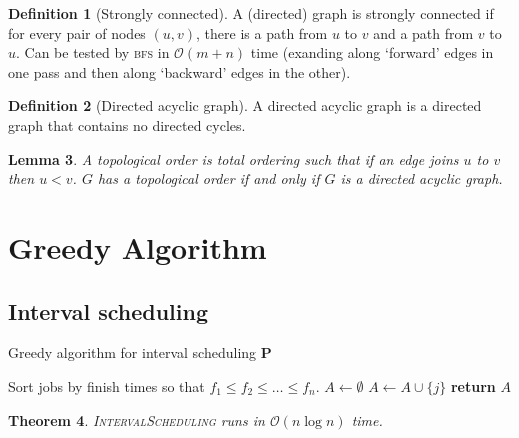 \documentclass[10pt, oneside, reqno]{amsart}
\theoremstyle{plain}%
\newtheorem{thm}{Theorem}[section]
\newtheorem{lem}[thm]{Lemma}
\theoremstyle{definition}
\newtheorem{defn}[thm]{Definition}
\theoremstyle{remark}
\newcommand{\bigo}[1]{\mathcal{O}(#1)}
\begin{document}
\begin{defn}[Strongly connected]
	A (directed) graph is strongly connected if for every pair of nodes $(u,v)$, there is a path from $u$ to $v$ and a path from $v$ to $u$.  Can be tested by \textsc{bfs} in $\bigo{m+n}$ time (exanding along `forward' edges in one pass and then along `backward' edges in the other).
\end{defn}

\begin{defn}[Directed acyclic graph]
	A directed acyclic graph is a directed graph that contains no directed cycles.  
\end{defn}

\begin{lem}
	A topological order is total ordering such that if an edge joins $u$ to $v$ then $u < v$.
	$G$ has a topological order if and only if $G$ is a directed acyclic graph.
\end{lem}





\section{Greedy Algorithm} %
\label{sec:greedy_algorithm}
\subsection{Interval scheduling} %
\label{sub:interval_scheduling}

\begin{algorithm}[H]
	\label{alg:dynamic_rising_trend}
	\caption{Greedy algorithm for interval scheduling \textbf{P}}
	\begin{algorithmic}[1]
			\State Sort jobs by finish times so that $f_1 \leq f_2 \leq \dots \leq f_n$.
			\State $A \gets \emptyset$
					\State $A \gets A \cup \{j\}$
				\EndIf
			\EndFor
			\State \textbf{return} $A$
	\EndProcedure
	\end{algorithmic}
\end{algorithm}

\begin{thm}
	\textsc{IntervalScheduling} runs in $\bigo{n \log n}$ time.
\end{thm}
\end{document}
